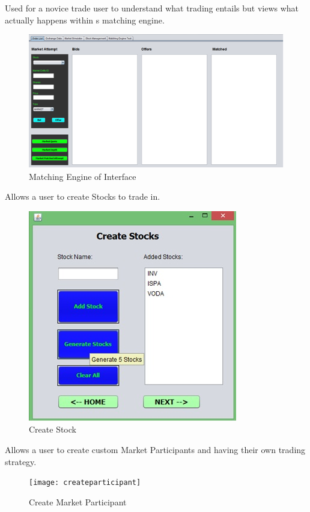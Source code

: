 \documentclass[12pt]{article}
\begin{document}
            Used for a novice trade user to understand what trading entails but views what actually happens within s matching engine.
          
            \begin{figure}[th]
            \centering
            \includegraphics[scale=0.8]{matchingengine}
            \caption{Matching Engine of Interface}
            \label{Matching Engine}
            \end{figure}
            
             Allows a user to create Stocks to trade in.

        \pagebreak
\begin{figure}[h!]
\centering
\includegraphics[scale=0.8]{createstock}
\caption{Create Stock}
\label{Create Stock}
\end{figure}

    Allows a user to create custom Market Participants and having their own trading strategy.

            
\begin{figure}[h!]
\centering
\texttt{[image: createparticipant]}
\caption{Create Market Participant}
\label{Create Market Participant}
\end{figure}
\end{document}
